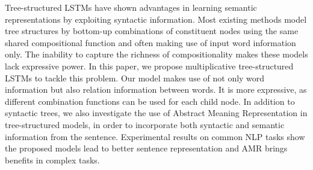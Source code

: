 Tree-structured LSTMs have shown advantages in learning semantic representations by exploiting syntactic information. Most existing methods model tree structures by bottom-up combinations of constituent nodes using the same shared compositional function and often making use of input word information only. The inability to capture the richness of compositionality makes these models lack expressive power. In this paper, we propose multiplicative tree-structured LSTMs to tackle this problem. Our model makes use of not only word information but also relation information between words. It is more expressive, as different combination functions can be used for each child node. In addition to syntactic trees, we also investigate the use of Abstract Meaning Representation in tree-structured models, in order to incorporate both syntactic and semantic information from the sentence. Experimental results on common NLP tasks show the proposed models lead to better sentence representation and AMR brings benefits in complex tasks.
